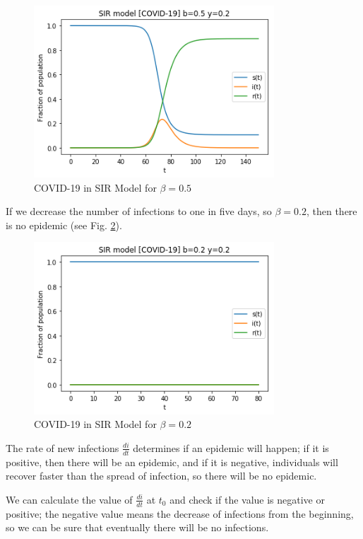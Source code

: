 \begin{figure}[ht]
\includegraphics[width=9cm]{img/covidb12y15.png}
\centering
\caption{COVID-19 in SIR Model for $\beta=0.5$}
\label{fig:covid1}
\end{figure} 


If we decrease the number of infections to one in five days, so $\beta = 0.2$, then there is no epidemic (see Fig. \ref{fig:covid3}).

\begin{figure}[ht]
    \includegraphics[width=9cm]{img/covidb15y15.png}
    \centering
    \caption{COVID-19 in SIR Model for $\beta=0.2$}
    \label{fig:covid3}
\end{figure} 

The rate of new infections $\frac{di}{dt}$ determines if an epidemic will happen; if it is positive, then there will be an epidemic, and if it is negative, individuals will recover faster than the spread of infection, so there will be no epidemic.

We can calculate the value of $\frac{di}{dt}$ at $t_0$ and check if the value is negative or positive; the negative value means the decrease of infections from the beginning, so we can be sure that eventually there will be no infections.

